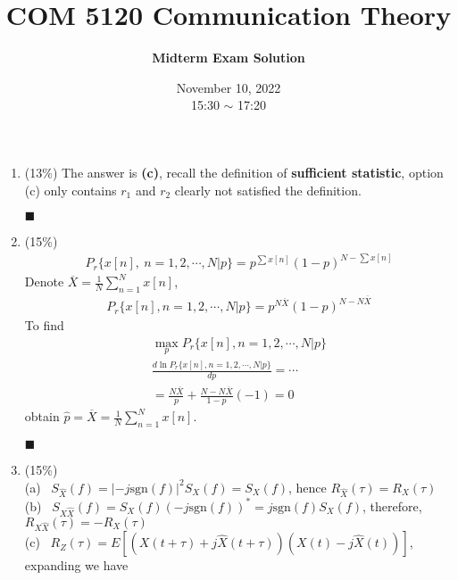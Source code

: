 \documentclass[a4paper,12pt]{article}
\title{\textbf{COM 5120 Communication Theory}}
\author{\textbf{Midterm Exam Solution}}
\date{November 10, 2022\\
15:30 $\sim$ 17:20
}
\begin{document}
    \maketitle
    \begin{enumerate}
        \item (13\%) 
            The answer is \textbf{(c)}, recall the definition of \textbf{sufficient statistic}, option (c) only contains $r_1$ and $r_2$ clearly not satisfied the definition.
            \begin{flushright}
                $\blacksquare$
            \end{flushright}
        \item (15\%) 
            \begin{align*}
                P_r\{x[n], \ n=1,2,\cdots,N|p\}=p^{\sum x[n]}(1-p)^{N-\sum x[n]}
            \end{align*}
            Denote $\overline{X}=\frac{1}{N}\sum\limits_{n=1}^Nx[n]$,
            \begin{align*}
                P_r\{ x[n],n=1,2,\cdots,N|p\}=p^{N\overline{X}}(1-p)^{N-N\overline{X}}
            \end{align*}
            To find 
            \begin{align*}
                \max_{p} P_r\{x[n],n=1,2,\cdots,N|p\}\\
                \frac{d\ln P_r\{ x[n],n=1,2,\cdots,N|p\}}{dp}=\cdots\\
                =\frac{N\overline{X}}{p}+\frac{N-N\overline{X}}{1-p}(-1)=0
            \end{align*}
            obtain $\widehat{p}=\overline{X}=\frac{1}{N}\sum\limits_{n=1}^{N}x[n]$.
            \begin{flushright}
                $\blacksquare$
            \end{flushright}
        \item (15\%) \\
        (a) \ $S_{\widehat{X}}(f)=|-j\text{sgn}(f)|^2S_X(f)=S_X(f)$, hence $R_{\widehat{X}}(\tau)=R_X(\tau)$\\
        (b) \ $S_{X\widehat{X}}(f)=S_X(f)(-j\text{sgn}(f))^*=j\text{sgn}(f)S_X(f)$, therefore, $R_{X\widehat{X}}(\tau)=-R_{X}(\tau)$\\
        (c) \ $R_Z(\tau)=E\left[ \left( X(t+\tau)+j\widehat{X}(t+\tau)\right)\left( X(t)-j\widehat{X}(t)\right)\right]$, expanding we have
        \begin{align*}

\end{align*}
\end{enumerate}
\end{document}
